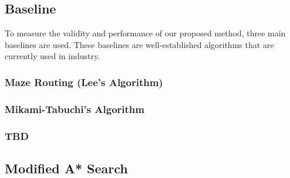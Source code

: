 \subsection{Baseline}
To measure the validity and performance of our proposed method, three main baselines are used. These baselines are well-established algorithms that are currently used in industry.

\subsubsection{Maze Routing (Lee's Algorithm)}

\subsubsection{Mikami-Tabuchi’s Algorithm}

\subsubsection{TBD}

\subsection{Modified A* Search}